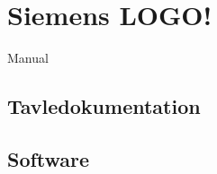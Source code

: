\section{Siemens LOGO!}

\cite{logo_sm} Manual

\subsection{Tavledokumentation}
\subsection{Software}
